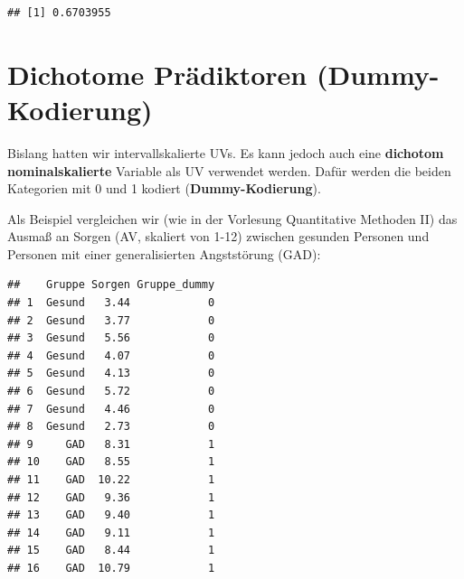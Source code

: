 \documentclass[
]{book}
\newenvironment{Shaded}{\begin{snugshade}}{\end{snugshade}}
\newcommand{\AttributeTok}[1]{\textcolor[rgb]{0.13,0.29,0.53}{#1}}
\newcommand{\CommentTok}[1]{\textcolor[rgb]{0.56,0.35,0.01}{\textit{#1}}}
\newcommand{\DecValTok}[1]{\textcolor[rgb]{0.00,0.00,0.81}{#1}}
\newcommand{\FloatTok}[1]{\textcolor[rgb]{0.00,0.00,0.81}{#1}}
\newcommand{\FunctionTok}[1]{\textcolor[rgb]{0.13,0.29,0.53}{\textbf{#1}}}
\newcommand{\NormalTok}[1]{#1}
\newcommand{\OtherTok}[1]{\textcolor[rgb]{0.56,0.35,0.01}{#1}}
\newcommand{\SpecialCharTok}[1]{\textcolor[rgb]{0.81,0.36,0.00}{\textbf{#1}}}
\newcommand{\StringTok}[1]{\textcolor[rgb]{0.31,0.60,0.02}{#1}}
\begin{document}
\begin{verbatim}
## [1] 0.6703955
\end{verbatim}

\section{Dichotome Prädiktoren (Dummy-Kodierung)}\label{dichotome-pruxe4diktoren-dummy-kodierung}

Bislang hatten wir intervallskalierte UVs. Es kann jedoch auch eine \textbf{dichotom nominalskalierte} Variable als UV verwendet werden. Dafür werden die beiden Kategorien mit 0 und 1 kodiert (\textbf{Dummy-Kodierung}).

Als Beispiel vergleichen wir (wie in der Vorlesung Quantitative Methoden II) das Ausmaß an Sorgen (AV, skaliert von 1-12) zwischen gesunden Personen und Personen mit einer generalisierten Angststörung (GAD):

\begin{Shaded}
\end{Shaded}

\begin{verbatim}
##    Gruppe Sorgen Gruppe_dummy
## 1  Gesund   3.44            0
## 2  Gesund   3.77            0
## 3  Gesund   5.56            0
## 4  Gesund   4.07            0
## 5  Gesund   4.13            0
## 6  Gesund   5.72            0
## 7  Gesund   4.46            0
## 8  Gesund   2.73            0
## 9     GAD   8.31            1
## 10    GAD   8.55            1
## 11    GAD  10.22            1
## 12    GAD   9.36            1
## 13    GAD   9.40            1
## 14    GAD   9.11            1
## 15    GAD   8.44            1
## 16    GAD  10.79            1
\end{verbatim}
\end{document}
